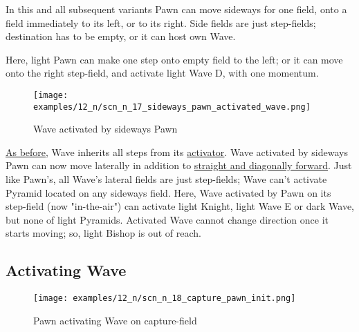 \vspace*{-0.5\baselineskip}
In this and all subsequent variants Pawn can move sideways for one field, onto a field
immediately to its left, or to its right. Side fields are just step-fields; destination
has to be empty, or it can host own Wave.

Here, light Pawn can make one step onto empty field to the left; or it can move onto
the right step-field, and activate light Wave D, with one momentum.

\clearpage %

\vspace*{-2.1\baselineskip}
\noindent
\begin{figure}[!h]
\texttt{[image: examples/12\_n/scn\_n\_17\_sideways\_pawn\_activated\_wave.png]}
\vspace*{-1.4\baselineskip}
\caption{Wave activated by sideways Pawn}
\label{fig:scn_n_17_sideways_pawn_activated_wave}
\end{figure}

\vspace*{-0.5\baselineskip}
\hyperref[fig:scn_mv_15_bishop_activating_wave]{As before}, Wave inherits all steps
from its \hyperref[sec:Terms/Activator]{activator}. Wave activated by sideways Pawn
can now move laterally in addition to
\hyperref[fig:scn_mv_22_wave_activated_by_step_pawn]{straight and diagonally forward}.
Just like Pawn's, all Wave's lateral fields are just step-fields; Wave can't activate
Pyramid located on any sideways field.\newline
\indent
Here, Wave activated by Pawn on its step-field (now "in-the-air") can activate light
Knight, light Wave E or dark Wave, but none of light Pyramids. Activated Wave cannot
change direction once it starts moving; so, light Bishop is out of reach.

\clearpage %

\subsection*{Activating Wave}
\label{sec:Nineteen/Sideways Pawns/Activating Wave}

\vspace*{-1.4\baselineskip}
\noindent
\begin{figure}[!h]
\texttt{[image: examples/12\_n/scn\_n\_18\_capture\_pawn\_init.png]}
\vspace*{-1.4\baselineskip}
\caption{Pawn activating Wave on capture-field}
\label{fig:scn_n_18_capture_pawn_init}
\end{figure}

